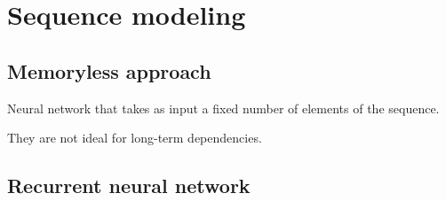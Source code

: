 \chapter{Sequence modeling}


\section{Memoryless approach}

Neural network that takes as input a fixed number of elements of the sequence.

\begin{remark}
    They are not ideal for long-term dependencies.
\end{remark}



\section{Recurrent neural network}

